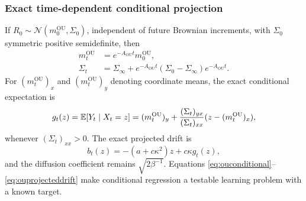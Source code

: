 \documentclass[12pt,a4paper,oneside]{book}
\begin{document}
\subsubsection{Exact time-dependent conditional projection}
If $R_0\sim\mathcal N(m_0^{\mathrm{OU}},\Sigma_0)$, independent of future Brownian
increments, with $\Sigma_0$ symmetric positive semidefinite, then
\begin{equation}
\begin{aligned}
m_t^{\mathrm{OU}}&=e^{-A_{\mathrm{OU}}t}m_0^{\mathrm{OU}},\\
 \Sigma_t&=\Sigma_\infty
  +e^{-A_{\mathrm{OU}}t}(\Sigma_0-\Sigma_\infty)e^{-A_{\mathrm{OU}}t}.
\end{aligned}
\label{eq:outimedep}
\end{equation}
For $(m_t^{\mathrm{OU}})_x$ and $(m_t^{\mathrm{OU}})_y$ denoting coordinate means, the exact
conditional expectation is
\begin{equation}
 g_t(z)=\mathbb{E}[Y_t\mid X_t=z]
 =(m_t^{\mathrm{OU}})_y+\frac{(\Sigma_t)_{yx}}{(\Sigma_t)_{xx}}
 (z-(m_t^{\mathrm{OU}})_x),
\label{eq:ouconditional}
\end{equation}
whenever $(\Sigma_t)_{xx}>0$. The exact projected drift is
\begin{equation}
 b_t(z)=-(a+c\kappa^2)z+c\kappa g_t(z),
\label{eq:ouprojecteddrift}
\end{equation}
and the diffusion coefficient remains $\sqrt{2\beta^{-1}}$.
Equations \eqref{eq:ouconditional}--\eqref{eq:ouprojecteddrift} make
conditional regression a testable learning problem with a known target.
\end{document}
